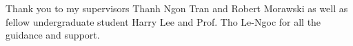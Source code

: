 Thank you to my supervisors Thanh Ngon Tran and Robert Morawski as well as fellow undergraduate student Harry Lee and Prof. Tho Le-Ngoc for all the guidance and support.





%








